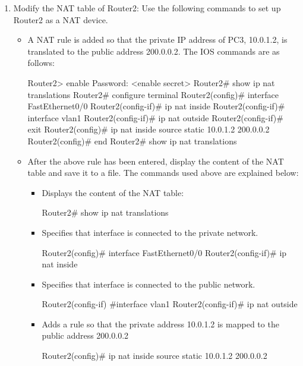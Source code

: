 \begin{enumerate}
	\item Modify the NAT table of Router2: Use the following commands to set up Router2 as a NAT device.
		\begin{itemize}
			\item A NAT rule is added so that the private IP address of PC3, 10.0.1.2, is translated to the public address 200.0.0.2.
				The IOS commands are as follows:
				\begin{cmdblock}
	Router2> enable
	Password: <enable secret>
	Router2# show ip nat translations
	Router2# configure terminal
	Router2(config)# interface FastEthernet0/0
	Router2(config-if)# ip nat inside
	Router2(config-if)# interface vlan1
	Router2(config-if)# ip nat outside
	Router2(config-if)# exit
	Router2(config)# ip nat inside source static 10.0.1.2 200.0.0.2 
	Router2(config)# end
	Router2# show ip nat translations
				\end{cmdblock}
			\item After the above rule has been entered, display the content of the NAT table and save it to a file.
				The commands used above are explained below:
				\begin{itemize}
					\item Displays the content of the NAT table:
						\begin{cmdblock}
	Router2# show ip nat translations
						\end{cmdblock}
					\item Specifies that interface  is connected to the private network.
						\begin{cmdblock}
	Router2(config)# interface FastEthernet0/0
	Router2(config-if)# ip nat inside
						\end{cmdblock}
					\item Specifies that interface  is connected to the public network.
						\begin{cmdblock}
	Router2(config-if) #interface vlan1
	Router2(config-if)# ip nat outside
						\end{cmdblock}
					\item Adds a rule so that the private address 10.0.1.2 is mapped to the public address 200.0.0.2
						\begin{cmdblock}
	Router2(config)# ip nat inside source static 10.0.1.2 200.0.0.2
						\end{cmdblock}
				\end{itemize}
			\end{itemize}

\end{enumerate}
